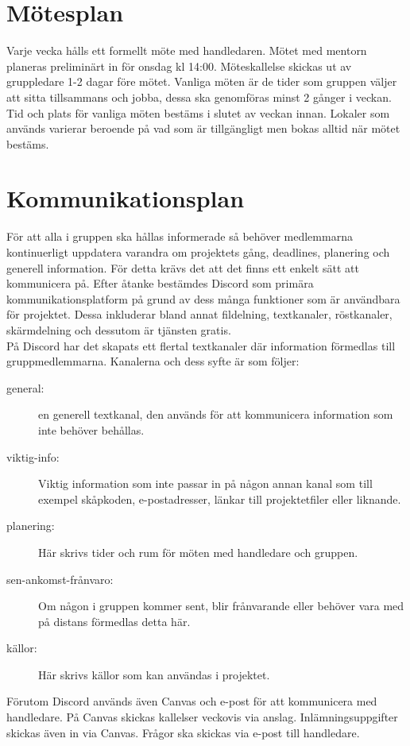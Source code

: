 \documentclass[a4paper]{article}
\begin{document}
\section{Mötesplan}
Varje vecka hålls ett formellt möte med handledaren. Mötet med mentorn planeras preliminärt in för onsdag kl 14:00. Möteskallelse skickas ut av gruppledare 1-2 dagar före mötet. Vanliga möten är de tider som gruppen väljer att sitta tillsammans och jobba, dessa ska genomföras minst 2 gånger i veckan. Tid och plats för vanliga möten bestäms i slutet av veckan innan. Lokaler som används varierar beroende på vad som är tillgängligt men bokas alltid när mötet bestäms.



\section{Kommunikationsplan}
För att alla i gruppen ska hållas informerade så behöver medlemmarna kontinuerligt uppdatera varandra om projektets gång, deadlines, planering och generell information. För detta krävs det att det finns ett enkelt sätt att kommunicera på. Efter åtanke bestämdes Discord som primära kommunikationsplatform på grund av dess många funktioner som är användbara för projektet. Dessa inkluderar bland annat fildelning, textkanaler, röstkanaler, skärmdelning och dessutom är tjänsten gratis. \\

På Discord har det skapats ett flertal textkanaler där information förmedlas till gruppmedlemmarna. Kanalerna och dess syfte är som följer:

\begin{description}
 \item[general:] en generell textkanal, den används för att kommunicera information som inte behöver behållas.
 \item[viktig-info:] Viktig information som inte passar in på någon annan kanal som till exempel skåpkoden, e-postadresser, länkar till projektetfiler eller liknande.
 \item[planering:] Här skrivs tider och rum för möten med handledare och gruppen.
 \item [sen-ankomst-frånvaro:] Om någon i gruppen kommer sent, blir frånvarande eller behöver vara med på distans förmedlas detta här.
 \item [källor:] Här skrivs källor som kan användas i projektet.
\end{description}

Förutom Discord används även Canvas och e-post för att kommunicera med handledare. På Canvas skickas kallelser veckovis via anslag. Inlämningsuppgifter skickas även in via Canvas. Frågor ska skickas via e-post till handledare.
\end{document}
